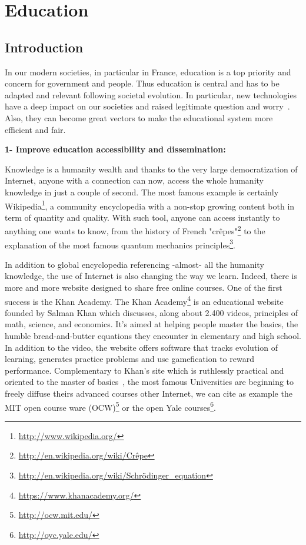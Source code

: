 

\cleartoleftpage


\chapter{Education} %


\section{Introduction} %

In our modern societies, in particular in France, education is a top priority and concern for government and people. Thus education is central and has to be adapted and relevant following societal evolution. In particular, new technologies have a deep impact on our societies and raised legitimate question and worry~\cite{plester2008txt}. Also, they can become great vectors to make the educational system more efficient and fair.


\textbf{1- Improve education accessibility and dissemination:}

Knowledge is a humanity wealth and thanks to the very large democratization of Internet, anyone with a connection can now, access the whole humanity knowledge in just a couple of second. The most famous example is certainly Wikipedia\footnote{\url{http://www.wikipedia.org/}}, a community encyclopedia with a non-stop growing content both in term of quantity and quality. With such tool, anyone can access instantly to anything one wants to know, from the history of French "crêpes"\footnote{\url{http://en.wikipedia.org/wiki/Crêpe}} to the explanation of the most famous quantum mechanics principles\footnote{\url{http://en.wikipedia.org/wiki/Schrödinger_equation}}.

In addition to global encyclopedia referencing -almost- all the humanity knowledge, the use of Internet is also changing the way we learn. Indeed, there is more and more website designed to share free online courses. One of the first success is the Khan Academy.
The Khan Academy\footnote{\url{https://www.khanacademy.org/}} is an educational website founded by Salman Khan which discusses, along about 2.400 videos, principles of math, science, and economics.  It's aimed at helping people master the basics, the humble bread-and-butter equations they encounter in elementary and high school. In addition to the video, the website offers software that tracks evolution of learning, generates practice problems and use gamefication to reward performance.
Complementary to Khan's site which is ruthlessly practical and oriented to the master of basics~\cite{thompson2011khan}, the most famous Universities are beginning to freely diffuse theirs advanced courses other Internet, we can cite as example the MIT open course ware (OCW)\footnote{\url{http://ocw.mit.edu/}} or the open Yale courses\footnote{\url{http://oyc.yale.edu/}}.

